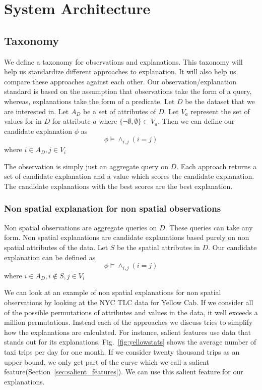 \chapter{System Architecture}
\label{chp:architecture}
\section{Taxonomy}
\label{sec:taxonomy}
We define a taxonomy for observations and explanations. This taxonomy will help us standardize different approaches to explanation. It will also help us compare these approaches against each other. Our observation/explanation standard is based on the assumption that observations take the form of a query, whereas, explanations take the form of a predicate. Let $D$ be the dataset that we are interested in. Let $A_D$ be a set of attributes of $D$. Let $V_a$ represent the set of values for in $D$ for attribute $a$ where $\{\neg \emptyset,\emptyset\} \subset V_a$. Then we can define our candidate explanation $\phi$ as $$\phi \models \wedge_{i,j} {(i=j)}$$ where $i \in A_D, j \in V_i $

The observation is simply just an aggregate query on $D$. Each approach returns a set of candidate explanation and a value which scores the candidate explanation. The candidate explanations with the best scores are the best explanation.

\subsection{Non spatial explanation for non spatial observations}
\label{sec:nonspatial_nonspatial}

Non spatial observations are aggregate queries on $D$. These queries can take any form. Non spatial explanations are candidate explanations based purely on non spatial attributes of the data. Let $S$ be the spatial attributes in $D$. Our candidate explanation can be defined as
$$\phi \models \wedge_{i,j} {(i=j)}$$
where $i \in A_D, i \notin S, j \in V_i$

We can look at an example of non spatial explanations for non spatial observations by looking at the NYC TLC data for Yellow Cab. If we consider all of the possible permutations of attributes and values in the data, it well exceeds a million permutations. Instead each of the approaches we discuss tries to simplify how the explanations are calculated. For instance, salient features use data that stands out for its explanations. Fig.~\ref{fig:yellowstats} shows the average number of taxi trips per day for one month. If we consider twenty thousand trips as an upper bound, we only get part of the curve which we call a salient feature(Section~\ref{sec:salient_features}). We can use this salient feature for our explanations.


